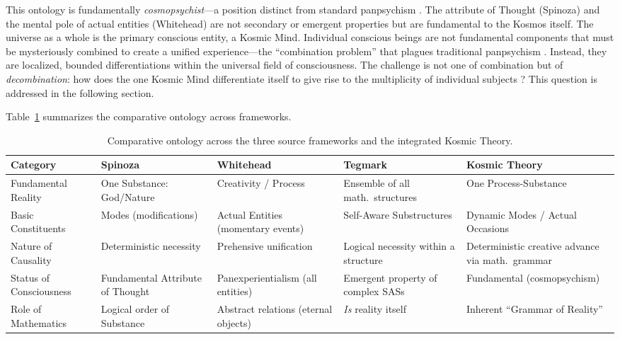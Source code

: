\documentclass[12pt,a4paper]{article}
\begin{document}
This ontology is fundamentally \emph{cosmopsychist}---a position distinct
from standard panpsychism \citep{shani2015,nagasawa2017}.  The attribute
of Thought (Spinoza) and the mental pole of actual entities (Whitehead) are
not secondary or emergent properties but are fundamental to the Kosmos
itself.  The universe as a whole is the primary conscious entity, a Kosmic
Mind.  Individual conscious beings are not fundamental components that must
be mysteriously combined to create a unified experience---the
``combination problem'' that plagues traditional panpsychism
\citep{chalmers2016}.  Instead, they are localized, bounded
differentiations within the universal field of consciousness.  The
challenge is not one of combination but of \emph{decombination}: how does
the one Kosmic Mind differentiate itself to give rise to the multiplicity
of individual subjects \citep{roelofs2019}?  This question is addressed in
the following section.

Table~\ref{tab:ontology} summarizes the comparative ontology across
frameworks.

\begin{table}[ht]
\centering
\small
\renewcommand{\arraystretch}{1.3}
\begin{tabular}{@{}p{2.4cm}p{2.4cm}p{2.6cm}p{2.3cm}p{2.8cm}@{}}
\toprule
\textbf{Category} & \textbf{Spinoza} & \textbf{Whitehead} & \textbf{Tegmark} & \textbf{Kosmic Theory} \\
\midrule
Fundamental Reality &
    One Substance: God/Nature &
    Creativity / Process &
    Ensemble of all math.\ structures &
    One Process-Substance \\
Basic Constituents &
    Modes (modifications) &
    Actual Entities (momentary events) &
    Self-Aware Sub\-structures &
    Dynamic Modes / Actual Occasions \\
Nature of Causality &
    Deterministic necessity &
    Prehensive unification &
    Logical necessity within a structure &
    Deterministic creative advance via math.\ grammar \\
Status of Consciousness &
    Fundamental Attribute of Thought &
    Panexperientialism (all entities) &
    Emergent property of complex SASs &
    Fundamental (cosmopsychism) \\
Role of Mathematics &
    Logical order of Substance &
    Abstract relations (eternal objects) &
    \emph{Is} reality itself &
    Inherent ``Grammar of Reality'' \\
\bottomrule
\end{tabular}
\caption{Comparative ontology across the three source frameworks and the
    integrated Kosmic Theory.}
\label{tab:ontology}
\end{table}
\end{document}
